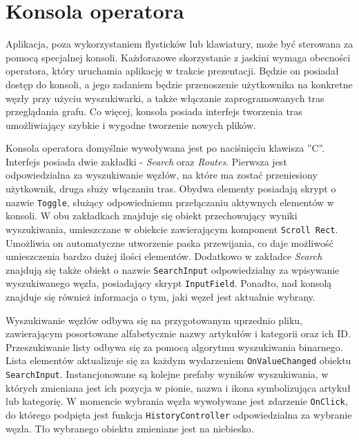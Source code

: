 \section{Konsola operatora}
Aplikacja, poza wykorzystaniem flysticków lub klawiatury, może być sterowana za pomocą specjalnej konsoli. Każdorazowe skorzystanie z jaskini wymaga obecności operatora, który uruchamia aplikację w trakcie prezentacji. Będzie on posiadał dostęp do konsoli, a jego zadaniem będzie przenoszenie użytkownika na konkretne węzły przy użyciu wyszukiwarki, a także włączanie zaprogramowanych tras przeglądania grafu. Co więcej, konsola posiada interfejs tworzenia tras umożliwiający szybkie i wygodne tworzenie nowych plików. 

Konsola operatora domyślnie wywoływana jest po naciśnięciu klawisza ''C''. Interfejs posiada dwie zakładki - \textit{Search} oraz \textit{Routes}. Pierwsza jest odpowiedzialna za wyszukiwanie węzłów, na które ma zostać przeniesiony użytkownik, druga służy włączaniu tras. Obydwa elementy posiadają skrypt o nazwie \lstinline[basicstyle=\normalsize]{Toggle}, służący odpowiedniemu przełączaniu aktywnych elementów w konsoli. W obu zakładkach znajduje się obiekt przechowujący wyniki wyszukiwania, umieszczane w obiekcie zawierającym komponent  \lstinline[basicstyle=\normalsize]{Scroll Rect}. Umożliwia on automatyczne utworzenie paska przewijania, co daje możliwość umieszczenia bardzo dużej ilości elementów.  Dodatkowo w zakładce \textit{Search} znajdują się także obiekt o nazwie  \lstinline[basicstyle=\normalsize]{SearchInput} odpowiedzialny za wpisywanie wyszukiwanego węzła, posiadający skrypt  \lstinline[basicstyle=\normalsize]{InputField}. Ponadto, nad konsolą znajduje się również informacja o tym, jaki węzeł jest aktualnie wybrany.


Wyszukiwanie węzłów odbywa się na przygotowanym uprzednio pliku, zawierającym posortowane alfabetycznie nazwy artykułów i kategorii oraz ich ID. Przeszukiwanie listy odbywa się za pomocą algorytmu wyszukiwania binarnego. Lista elementów aktualizuje się za każdym wydarzeniem  \lstinline[basicstyle=\normalsize]{OnValueChanged} obiektu  \lstinline[basicstyle=\normalsize]{SearchInput}. Instancjonowane są kolejne prefaby wyników wyszukiwania, w których zmieniana jest ich pozycja w pionie, nazwa i ikona symbolizująca artykuł lub kategorię. W momencie wybrania węzła wywoływane jest zdarzenie  \lstinline[basicstyle=\normalsize]{OnClick}, do którego podpięta jest funkcja  \lstinline[basicstyle=\normalsize]{HistoryController} odpowiedzialna za wybranie węzła. Tło wybranego obiektu zmieniane jest na niebiesko.

